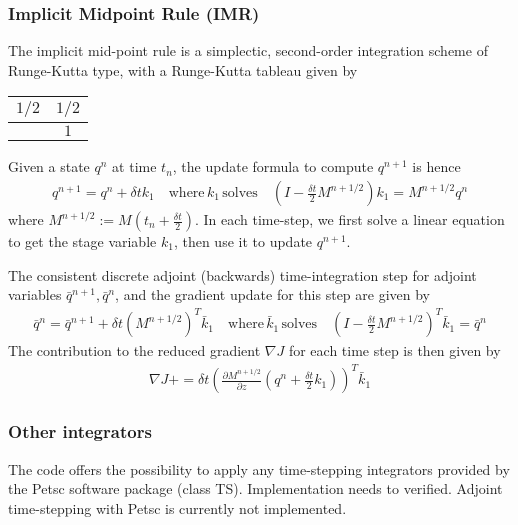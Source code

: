 \documentclass[letterpaper]{article}
\begin{document}
    \subsubsection{Implicit Midpoint Rule (IMR)} 
    The implicit mid-point rule is a simplectic, second-order integration scheme of Runge-Kutta type, with a Runge-Kutta tableau given by
    \begin{tabular}{ c | c }
      $1/2$ & $ 1/2$ \\
      \hline
                &  $1$
    \end{tabular}
    Given a state $q^n$ at time $t_n$, the update formula to compute $q^{n+1}$ is hence 
    \begin{align}
      q^{n+1} = q^n + \delta t k_1 \quad \text{where} \, k_1 \, \text{solves} \quad \left( I-\frac{\delta t}{2} M^{n+1/2} \right) k_1 = M^{n+1/2}  q^n
    \end{align}
    where $M^{n+1/2} := M(t_n + \frac{\delta t}{2})$. In each time-step, we first solve a linear equation to get the stage variable $k_1$, then use it to update $q^{n+1}$. 

    The consistent discrete adjoint (backwards) time-integration step for adjoint variables $\bar q^{n+1}, \bar q^n$, and the gradient update for this step are given by
    \begin{align}
      \bar q^{n} = \bar q^{n+1} + \delta t \left(M^{n+1/2}\right)^T \bar k_1 \quad \text{where} \, \bar k_1 \, \text{solves} \quad \left( I-\frac{\delta t}{2} M^{n+1/2}\right)^T  \bar k_1 = \bar q^n 
    \end{align}
    The contribution to the reduced gradient $\nabla J$ for each time step is then given by
    \begin{align}
      \nabla J += \delta t \left( \frac{\partial M^{n+1/2}}{\partial z} \left(q^n + \frac{\delta t}{2} k_1\right) \right)^T\bar k_1
    \end{align}


    \subsubsection{Other integrators}
    The code offers the possibility to apply any time-stepping integrators provided by the Petsc software package (class TS). Implementation needs to verified. Adjoint time-stepping with Petsc is currently not implemented. 
\end{document}
